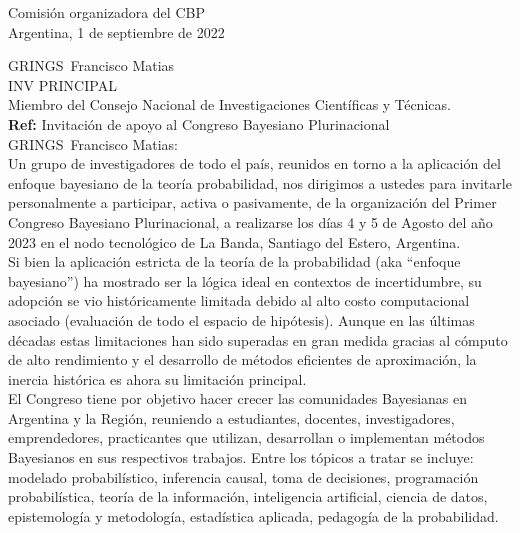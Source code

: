 \documentclass[a4paper,11pt]{article}
\begin{document}
\begin{flushright}
Comisión organizadora del CBP \\
Argentina, 1 de septiembre de 2022
\end{flushright} 

\vspace{0.1cm}
\noindent
GRINGS Francisco Matias\\
INV PRINCIPAL \\
Miembro del Consejo Nacional de Investigaciones Científicas y Técnicas.\\[-0.1cm]

\hfill \textbf{Ref:} Invitación de apoyo al Congreso Bayesiano Plurinacional \\

\vspace{0.3cm} \noindent GRINGS Francisco Matias:\\

\indent Un grupo de investigadores de todo el país, reunidos en torno a la aplicación del enfoque bayesiano de la teoría probabilidad, nos dirigimos a ustedes para invitarle personalmente a participar, activa o pasivamente, de la organización del Primer Congreso Bayesiano Plurinacional, a realizarse los días 4 y 5 de Agosto del año 2023 en el nodo tecnológico de La Banda, Santiago del Estero, Argentina. \\

\indent Si bien la aplicación estricta de la teoría de la probabilidad (aka ``enfoque bayesiano'') ha mostrado ser la lógica ideal en contextos de incertidumbre, su adopción se vio históricamente limitada debido al alto costo computacional asociado (evaluación de todo el espacio de hipótesis). Aunque en las últimas décadas estas limitaciones han sido superadas en gran medida gracias al cómputo de alto rendimiento y el desarrollo de métodos eficientes de aproximación, la inercia histórica es ahora su limitación principal. \\

\indent  El Congreso tiene por objetivo hacer crecer las comunidades Bayesianas en Argentina y la Región, reuniendo a estudiantes, docentes, investigadores, emprendedores, practicantes que utilizan, desarrollan o implementan métodos Bayesianos en sus respectivos trabajos. Entre los tópicos a tratar se incluye: modelado probabilístico, inferencia causal, toma de decisiones, programación probabilística, teoría de la información, inteligencia artificial, ciencia de datos, epistemología y metodología, estadística aplicada, pedagogía de la probabilidad. \\
\end{document}
